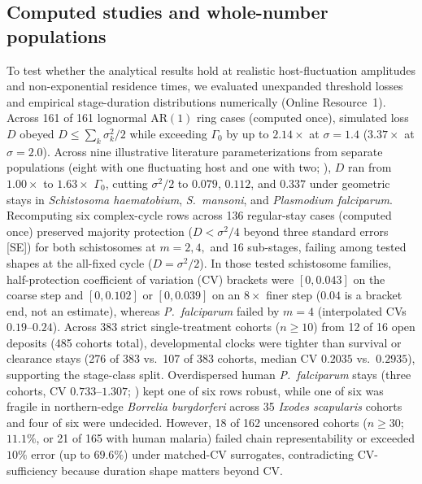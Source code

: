 \subsection{Computed studies and whole-number populations}\label{num-computed}

To test whether the analytical results hold at realistic host-fluctuation amplitudes and non-exponential residence times, we evaluated unexpanded threshold losses and empirical stage-duration distributions numerically (Online Resource~1). Across 161 of 161 lognormal $\mathrm{AR}(1)$ ring cases (computed once), simulated loss $D$ obeyed $D \le \sum_k \sigma_k^2/2$ while exceeding $\Gamma_0$ by up to $2.14\times$ at $\sigma = 1.4$ ($3.37\times$ at $\sigma = 2.0$). Across nine illustrative literature parameterizations from separate populations (eight with one fluctuating host and one with two; \citealp{ishikawa2003,smith2007,dunn2013,anderson2015,rabone2019}), $D$ ran from $1.00\times$ to $1.63\times$ $\Gamma_0$, cutting $\sigma^2/2$ to $0.079$, $0.112$, and $0.337$ under geometric stays in \emph{Schistosoma haematobium}, \emph{S.~mansoni}, and \emph{Plasmodium falciparum}. Recomputing six complex-cycle rows across 136 regular-stay cases (computed once) preserved majority protection ($D < \sigma^2/4$ beyond three standard errors [SE]) for both schistosomes at $m = 2, 4,$ and $16$ sub-stages, failing among tested shapes at the all-fixed cycle ($D = \sigma^2/2$). In those tested schistosome families, half-protection coefficient of variation (CV) brackets were $[0, 0.043]$ on the coarse step and $[0, 0.102]$ or $[0, 0.039]$ on an $8\times$ finer step ($0.04$ is a bracket end, not an estimate), whereas \emph{P.~falciparum} failed by $m = 4$ (interpolated CVs $0.19$--$0.24$). Across 383 strict single-treatment cohorts ($n \ge 10$) from 12 of 16 open deposits (485 cohorts total), developmental clocks were tighter than survival or clearance stays (276 of 383 vs.\ 107 of 383 cohorts, median CV $0.2035$ vs.\ $0.2935$), supporting the stage-class split. Overdispersed human \emph{P.~falciparum} stays (three cohorts, CV $0.733$--$1.307$; \citealp{andrade2024}) kept one of six rows robust, while one of six was fragile in northern-edge \emph{Borrelia burgdorferi} across 35 \emph{Ixodes scapularis} cohorts \citep{brunner2022} and four of six were undecided. However, 18 of 162 uncensored cohorts ($n \ge 30$; $11.1\%$, or 21 of 165 with human malaria) failed chain representability or exceeded $10\%$ error (up to $69.6\%$) under matched-CV surrogates, contradicting CV-sufficiency because duration shape matters beyond CV.

